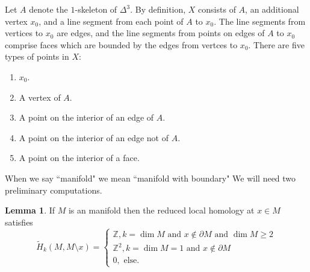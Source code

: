 \documentclass[10pt]{article}
\newcommand{\ZZ}{\mathbb{Z}}
\theoremstyle{definition}
\newtheorem{lemma}{Lemma}[exer]
\begin{document}
Let $A$ denote the $1$-skeleton of $\Delta^3$.
By definition, $X$ consists of $A$, an additional vertex $x_0$, and a line segment from each point of $A$ to $x_0$.
The line segments from vertices to $x_0$ are edges, and the line segments from points on edges of $A$ to $x_0$ comprise faces which are bounded by the edges from vertces to $x_0$.
There are five types of points in $X$:
\begin{enumerate}
\item $x_0$.
\item A vertex of $A$.
\item A point on the interior of an edge of $A$.
\item A point on the interior of an edge not of $A$.
\item A point on the interior of a face.
\end{enumerate}
When we say ``manifold" we mean ``manifold with boundary"
We will need two preliminary computations.
\begin{lemma}
If $M$ is an manifold then the reduced local homology at $x \in M$ satisfies
$$\widetilde H_k(M, M \setminus x) = \begin{cases}
\ZZ, k = \dim M\text{ and } x \notin \partial M\text{ and } \dim M \geq 2\\
\ZZ^2, k = \dim M = 1\text{ and } x \notin \partial M\\
0, \text{ else}.
\end{cases}$$
\end{lemma}
\end{document}
